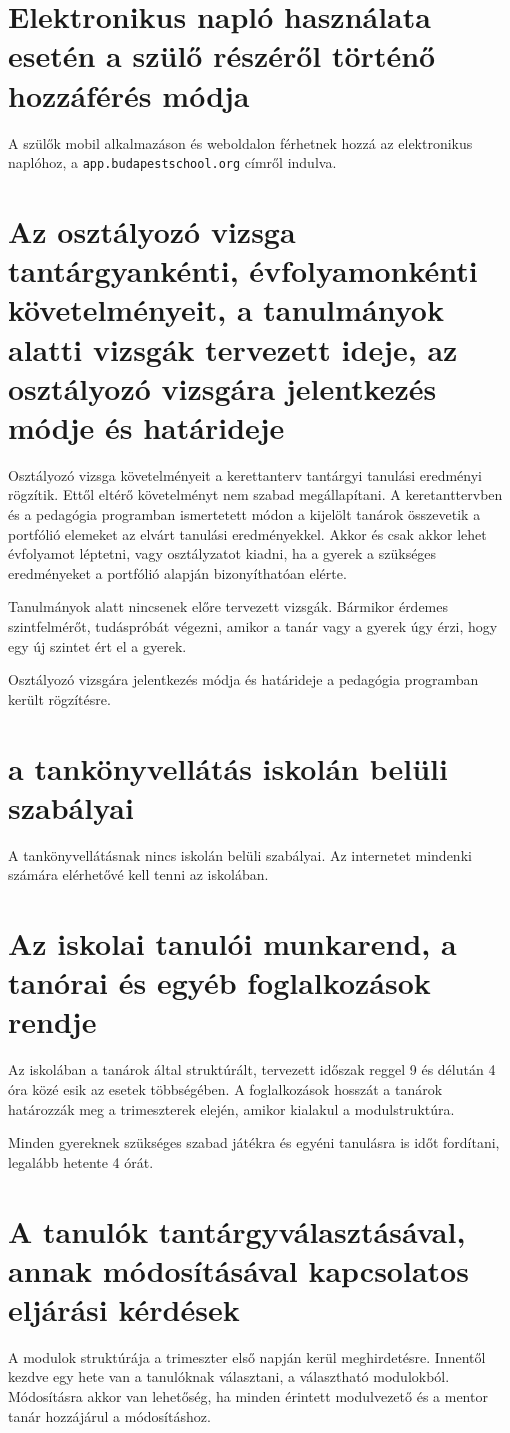 \documentclass{article}
\begin{document}
\section{Elektronikus napló használata esetén a szülő részéről történő hozzáférés módja}
A szülők mobil alkalmazáson és weboldalon férhetnek hozzá az elektronikus naplóhoz, a \texttt{app.budapestschool.org} címről indulva.

\section{Az osztályozó vizsga tantárgyankénti, évfolyamonkénti követelményeit, a tanulmányok alatti vizsgák tervezett ideje, az osztályozó vizsgára jelentkezés módje és határideje}
Osztályozó vizsga követelményeit a kerettanterv tantárgyi tanulási eredményi rögzítik. Ettől eltérő követelményt nem szabad megállapítani. A keretanttervben és a pedagógia programban ismertetett módon a kijelölt tanárok összevetik a portfólió elemeket az elvárt tanulási eredményekkel. Akkor és csak akkor lehet évfolyamot léptetni, vagy osztályzatot kiadni, ha a gyerek a szükséges eredményeket a portfólió alapján bizonyíthatóan elérte.

Tanulmányok alatt nincsenek előre tervezett vizsgák. Bármikor érdemes szintfelmérőt, tudáspróbát végezni, amikor a tanár vagy a gyerek úgy érzi, hogy egy új szintet ért el a gyerek.

Osztályozó vizsgára jelentkezés módja és határideje a pedagógia programban került rögzítésre.
\section{a tankönyvellátás iskolán belüli szabályai}
A tankönyvellátásnak nincs iskolán belüli szabályai. Az internetet mindenki számára elérhetővé kell tenni az iskolában. 

\section{Az iskolai tanulói munkarend, a tanórai és egyéb foglalkozások rendje}
Az iskolában a tanárok által struktúrált, tervezett időszak reggel 9 és délután 4 óra közé esik az esetek többségében. A foglalkozások hosszát a tanárok határozzák meg a trimeszterek elején, amikor kialakul a modulstruktúra.

Minden gyereknek szükséges szabad játékra és egyéni tanulásra is időt fordítani, legalább hetente 4 órát.

\section{A tanulók tantárgyválasztásával, annak módosításával kapcsolatos eljárási kérdések}
A modulok struktúrája a trimeszter első napján kerül meghirdetésre. Innentől kezdve egy hete van a tanulóknak választani, a választható modulokból. Módosításra akkor van lehetőség, ha minden érintett modulvezető és a mentor tanár hozzájárul a módosításhoz.
\end{document}

